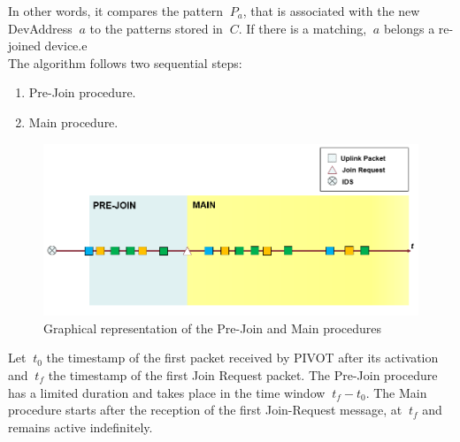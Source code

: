 In other words, it compares the pattern \(\ P_{a} \), that is associated with the new DevAddress \(\ a \) to the patterns stored in \(\ C \). If there is a matching, \(\ a \) belongs a re-joined device.e
\\
The algorithm follows two sequential steps:
\begin{enumerate}
	\item Pre-Join procedure.
	\item Main procedure.
\end{enumerate}

\begin{figure}
    \centering
    \includegraphics[width=0.7\linewidth]{images/pivot/pre-main.PNG}
    \caption{Graphical representation of the Pre-Join and Main procedures}
    \label{fig:pre_main}
\end{figure}

Let \(\ t_{0} \) the timestamp of the first packet received by PIVOT after its activation and \(\ t_{f} \) the timestamp of the first Join Request packet. The Pre-Join procedure has a limited duration and takes place in the time window \(\ t_{f} - t_{0} \). The Main procedure starts after the reception of the first Join-Request message, at \(\ t_{f} \) and remains active indefinitely.


